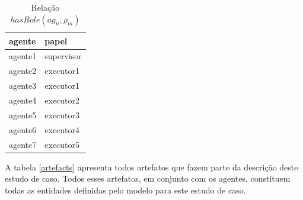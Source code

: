 \documentclass[12pt]{article}
\begin{document}
\begin{table}[H]
\centering
\begin{tabular}{|l|l|}
\hline
\textbf{agente} & \textbf{papel} \\ \hline
agente1 & supervisor \\ \hline
agente2 & executor1 \\ \hline
agente3 & executor1 \\ \hline
agente4 & executor2 \\ \hline
agente5 & executor3 \\ \hline
agente6 & executor4 \\ \hline
agente7 & executor5 \\ \hline
\end{tabular}
\caption{Relação $hasRole(ag_n,\rho_m)$}
\label{agentsroles}
\end{table}

A tabela \ref{artefacts} apresenta todos artefatos que fazem parte da descrição deste estudo de caso. Todos esses artefatos, em conjunto com os agentes, constituem todas as entidades definidas pelo modelo para este estudo de caso.
\end{document}
